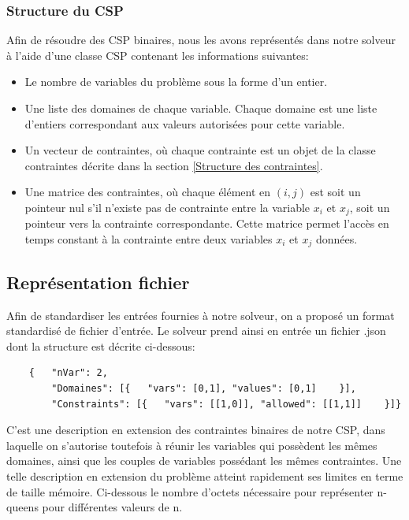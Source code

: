 \documentclass[14pt]{article}
\begin{document}
\subsubsection{Structure du CSP}

Afin de résoudre des CSP binaires, nous les avons représentés dans notre solveur à l'aide d'une classe CSP contenant les informations suivantes:

\begin{itemize}
	\item Le nombre de variables du problème sous la forme d'un entier.
	\item Une liste des domaines de chaque variable. Chaque domaine est une liste d'entiers correspondant aux valeurs autorisées pour cette variable.
	\item Un vecteur de contraintes, où chaque contrainte est un objet de la classe contraintes décrite dans la section \ref{Structure des contraintes}.
	\item Une matrice des contraintes, où chaque élément en $(i,j)$ est soit un pointeur nul s'il n'existe pas de contrainte entre la variable $x_i$ et $x_j$, soit un pointeur vers la contrainte correspondante. Cette matrice permet l'accès en temps constant à la contrainte entre deux variables $x_i$ et $x_j$ données.
\end{itemize}

\subsection{Représentation fichier}

Afin de standardiser les entrées fournies à notre solveur, on a proposé un format standardisé de fichier d'entrée. Le solveur prend ainsi en entrée un fichier .json dont la structure est décrite ci-dessous:

\begin{verbatim}
	{   "nVar": 2,
	    "Domaines": [{   "vars": [0,1], "values": [0,1]    }],
	    "Constraints": [{   "vars": [[1,0]], "allowed": [[1,1]]    }]}
\end{verbatim}

C'est une description en extension des contraintes binaires de notre CSP, dans laquelle on s'autorise toutefois à réunir les variables qui possèdent les mêmes domaines, ainsi que les couples de variables possédant les mêmes contraintes. Une telle description en extension du problème atteint rapidement ses limites en terme de taille mémoire. Ci-dessous le nombre d'octets nécessaire pour représenter n-queens pour différentes valeurs de n.
\end{document}
